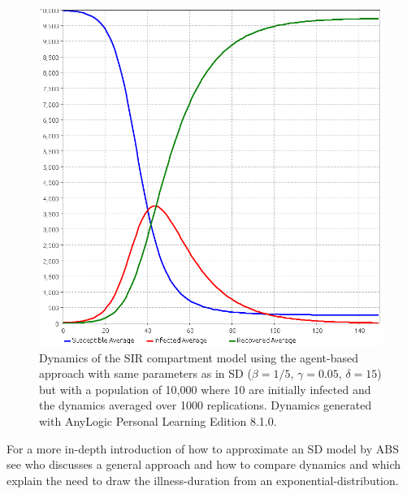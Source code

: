 \begin{figure}
	\centering
	\includegraphics[width=.4\textwidth, angle=0]{./../shared/fig/SIR_ABS_ANYLOGIC_10000Agents_10Init_1000Repls.png}
	\caption{Dynamics of the SIR compartment model using the agent-based approach with same parameters as in SD ($\beta = 1/5$, $\gamma = 0.05$, $\delta = 15$) but with a population of 10,000 where 10 are initially infected and the dynamics averaged over 1000 replications. Dynamics generated with AnyLogic Personal Learning Edition 8.1.0.}
	\label{fig:sir_abs_anylogic_agents_repls}
\end{figure}

For a more in-depth introduction of how to approximate an SD model by ABS see \cite{macal_agent-based_2010} who discusses a general approach and how to compare dynamics and \cite{borshchev_system_2004} which explain the need to draw the illness-duration from an exponential-distribution.